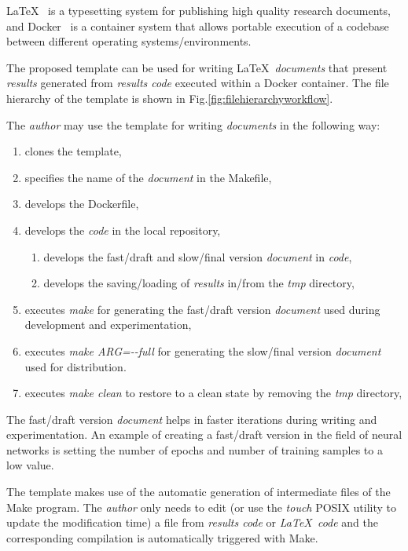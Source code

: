 \documentclass[journal]{IEEEtran}
\begin{document}
\LaTeX~\cite{lamport1994latex} is a typesetting system for publishing high quality research documents, and Docker~\cite{merkel2014docker} is a container system that allows portable execution of a codebase between different operating systems/environments.

The proposed template can be used for writing \LaTeX\ \textit{documents} that present \textit{results} generated from \textit{results code} executed within a Docker container.
The file hierarchy of the template is shown in Fig.\ref{fig:filehierarchyworkflow}.

The \textit{author} may use the template for writing \textit{documents} in the following way:
\begin{enumerate}
	\item clones the template,
	\item specifies the name of the \textit{document} in the Makefile,
	\item develops the Dockerfile,
	\item develops the \textit{code} in the local repository,
		\begin{enumerate}
			\item develops the fast/draft and slow/final version \textit{document} in \textit{code},
			\item develops the saving/loading of \textit{results} in/from the \textit{tmp} directory,
		\end{enumerate}
	\item executes \textit{make} for generating the fast/draft version \textit{document} used during development and experimentation,
	\item executes \textit{make ARG=-{}-full} for generating the slow/final version \textit{document} used for distribution.
	\item executes \textit{make clean} to restore to a clean state by removing the \textit{tmp} directory,
\end{enumerate}

The fast/draft version \textit{document} helps in faster iterations during writing and experimentation.
An example of creating a fast/draft version in the field of neural networks is setting the number of epochs and number of training samples to a low value.

The template makes use of the automatic generation of intermediate files of the Make program.
The \textit{author} only needs to edit (or use the \textit{touch} POSIX utility to update the modification time) a file from \textit{results code} or \textit{\LaTeX\ code} and the corresponding compilation is automatically triggered with Make.
\end{document}
